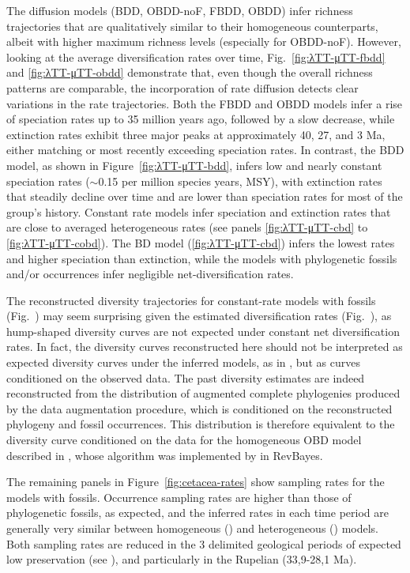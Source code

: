 \documentclass[oupdraft]{sysbio}
\begin{document}
The diffusion models (BDD, OBDD-noF, FBDD, OBDD) infer richness trajectories that are qualitatively similar to their homogeneous counterparts, albeit with higher maximum richness levels (especially for OBDD-noF). However, looking at the average diversification rates over time, Fig.~\ref{fig:λTT-μTT-fbdd} and \ref{fig:λTT-μTT-obdd} demonstrate that, even though the overall richness patterns are comparable, the incorporation of rate diffusion detects clear variations in the rate trajectories. Both the FBDD and OBDD models infer a rise of speciation rates up to 35 million years ago, followed by a slow decrease, while extinction rates exhibit three major peaks at approximately 40, 27, and 3 Ma, either matching or most recently exceeding speciation rates. In contrast, the BDD model, as shown in Figure~\ref{fig:λTT-μTT-bdd}, infers low and nearly constant speciation rates ($\sim$0.15 per million species years, MSY), with extinction rates that steadily decline over time and are lower than speciation rates for most of the group's history. Constant rate models infer speciation and extinction rates that are close to averaged heterogeneous rates (see panels \ref{fig:λTT-μTT-cbd} to \ref{fig:λTT-μTT-cobd}). The BD model (\ref{fig:λTT-μTT-cbd}) infers the lowest rates and higher speciation than extinction, while the models with phylogenetic fossils and/or occurrences infer negligible net-diversification rates.

The reconstructed diversity trajectories for constant-rate models with fossils (Fig.~) may seem surprising given the estimated diversification rates (Fig.~), as hump-shaped diversity curves are not expected under constant net diversification rates. In fact, the diversity curves reconstructed here should not be interpreted as expected diversity curves under the inferred models, as in \citet{etienne_diversity-dependence_2011, billaud_estimating_2019}, but as curves conditioned on the observed data. The past diversity estimates are indeed reconstructed from the distribution of augmented complete phylogenies produced by the data augmentation procedure, which is conditioned on the reconstructed phylogeny and fossil occurrences. This distribution is therefore equivalent to the diversity curve conditioned on the data for the homogeneous OBD model described in \citet{manceau_probability_2021}, whose algorithm was implemented by \citet{andreoletti_occurrence_2022} in RevBayes.

The remaining panels in Figure~\ref{fig:cetacea-rates} show sampling rates for the models with fossils. Occurrence sampling rates are higher than those of phylogenetic fossils, as expected, and the inferred rates in each time period are generally very similar between homogeneous () and heterogeneous () models. Both sampling rates are reduced in the 3 delimited geological periods of expected low preservation (see ), and particularly in the Rupelian (33,9-28,1 Ma).
\end{document}
